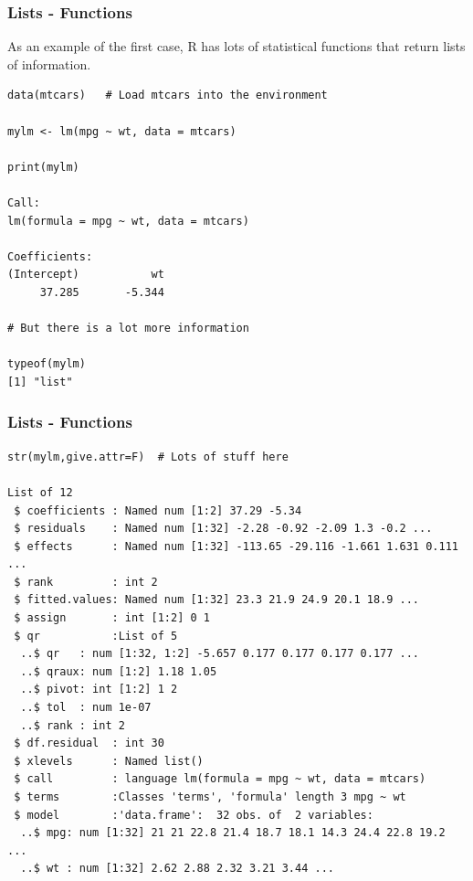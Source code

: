 \documentclass{beamer}
\begin{document}
%
\begin{frame}[fragile]
\frametitle{Lists - Functions}
As an example of the first case, R has lots of statistical functions that return lists of information.
\small
\begin{verbatim}
data(mtcars)   # Load mtcars into the environment

mylm <- lm(mpg ~ wt, data = mtcars)

print(mylm)

Call:
lm(formula = mpg ~ wt, data = mtcars)

Coefficients:
(Intercept)           wt  
     37.285       -5.344  

# But there is a lot more information

typeof(mylm)
[1] "list"
\end{verbatim}
\end{frame}

%
\begin{frame}[fragile]
\frametitle{Lists - Functions}

\scriptsize
\begin{verbatim}
str(mylm,give.attr=F)  # Lots of stuff here

List of 12
 $ coefficients : Named num [1:2] 37.29 -5.34
 $ residuals    : Named num [1:32] -2.28 -0.92 -2.09 1.3 -0.2 ...
 $ effects      : Named num [1:32] -113.65 -29.116 -1.661 1.631 0.111 ...
 $ rank         : int 2
 $ fitted.values: Named num [1:32] 23.3 21.9 24.9 20.1 18.9 ...
 $ assign       : int [1:2] 0 1
 $ qr           :List of 5
  ..$ qr   : num [1:32, 1:2] -5.657 0.177 0.177 0.177 0.177 ...
  ..$ qraux: num [1:2] 1.18 1.05
  ..$ pivot: int [1:2] 1 2
  ..$ tol  : num 1e-07
  ..$ rank : int 2
 $ df.residual  : int 30
 $ xlevels      : Named list()
 $ call         : language lm(formula = mpg ~ wt, data = mtcars)
 $ terms        :Classes 'terms', 'formula' length 3 mpg ~ wt
 $ model        :'data.frame':  32 obs. of  2 variables:
  ..$ mpg: num [1:32] 21 21 22.8 21.4 18.7 18.1 14.3 24.4 22.8 19.2 ...
  ..$ wt : num [1:32] 2.62 2.88 2.32 3.21 3.44 ...

\end{verbatim}
\end{frame}
\end{document}
